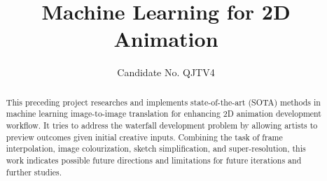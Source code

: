 
\title{Machine Learning for 2D Animation}
\author{Candidate No. QJTV4}  %

\maketitle
\makedeclaration

\begin{abstract} %
This preceding project researches and implements state-of-the-art (SOTA) methods in machine learning image-to-image translation for enhancing 2D animation development workflow. It tries to address the waterfall development problem by allowing artists to preview outcomes given initial creative inputs. Combining the task of frame interpolation, image colourization, sketch simplification, and super-resolution, this work indicates possible future directions and limitations for future iterations and further studies.
\end{abstract}


